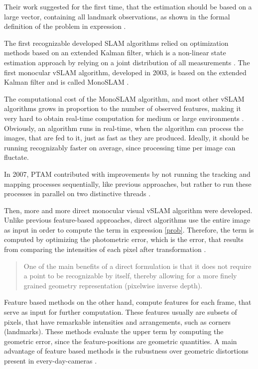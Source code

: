 Their work suggested for the first time, that the estimation should be based on a large vector, containing all landmark observations, as shown in the formal definition of the problem in 
expression \label{prob}.

The first recognizable developed SLAM algorithms relied on optimization methods based on an extended Kalman filter, which is a non-linear state estimation approach
 by relying on a joint distribution of all measurements \cite{evolved}. The first monocular vSLAM algorithm, developed in 2003, 
 is based on the extended Kalman filter and is called MonoSLAM \cite{mono}. 
 
 The computational cost of the MonoSLAM algorithm, and most other vSLAM algorithms grows in proportion to the number of observed features, making it very hard to obtain real-time 
 computation for medium or large environments \cite{envolved}. Obviously, an algorithm runs in real-time, when 
 the algorithm can process the images, that are fed to it, just as fast as they are produced. Ideally, it should 
 be running recognizably faster on average, since processing time per image can fluctate. 

 In 2007, PTAM contributed with improvements by not running the tracking and mapping processes
 sequentially, like previous approaches, but rather to run these processes in parallel on two distinctive threads \cite{ptam}. 
 
 Then, more and more direct monocular visual vSLAM algorithm were developed. Unlike previous feature-based approaches, direct algorithms use the entire image as input in order to compute the term in expression \ref{prob}. 
 Therefore, the term is computed by optimizing the photometric error, which is the error, that results from comparing the intensities 
 of each pixel after transformation \cite{dso}.

  \begin{quote}
	One of the main benefits of a direct formulation is that it
	does not require a point to be recognizable by itself, thereby
	allowing for a more finely grained geometry representation (pixelwise inverse depth). \cite{dso}
  \end{quote}

Feature based methods on the other hand, compute features for each frame, that serve as input for further computation. These features usually are subsets of pixels, that have remarkable 
intensities and arrangements, such as corners (landmarks). These methods evaluate the upper term by computing the geometric error, since the feature-positions are geometric 
quantities. A main advantage of feature based methods is the rubustness over geometric distortions present in every-day-cameras \cite{dso}. 

